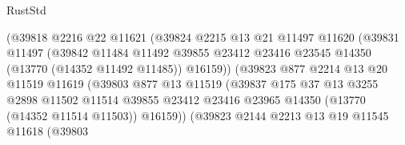 \begin{lexlean}{RustStd}
\begin{coremodule}
                                (@39818
                                  @2216
                                  @22
                                  @11621
                                  (@39824
                                    @2215
                                    @13
                                    @21
                                    @11497
                                    @11620
                                    (@39831
                                      @11497
                                      (@39842
                                        @11484
                                        @11492
                                        @39855
                                        @23412
                                        @23416
                                        @23545
                                        @14350
                                        (@13770 (@14352 @11492 @11485))
                                        @16159))
                                    (@39823
                                      @877
                                      @2214
                                      @13
                                      @20
                                      @11519
                                      @11619
                                      (@39803
                                        @877
                                        @13
                                        @11519
                                        (@39837
                                          @175
                                          @37
                                          @13
                                          @3255
                                          @2898
                                          @11502
                                          @11514
                                          @39855
                                          @23412
                                          @23416
                                          @23965
                                          @14350
                                          (@13770 (@14352 @11514 @11503))
                                          @16159))
                                      (@39823
                                        @2144
                                        @2213
                                        @13
                                        @19
                                        @11545
                                        @11618
                                        (@39803

\end{coremodule}
\end{lexlean}
